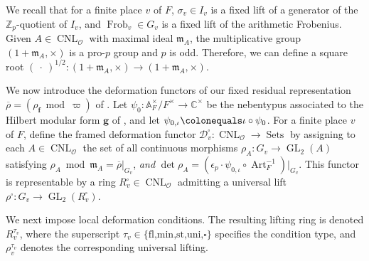 \documentclass[a4paper, notitlepage, 10pt]{amsart}
\theoremstyle{plain} %
\theoremstyle{definition} %
\theoremstyle{remark} %
\numberwithin{equation}{section}
\newcommand{\bbZ}{\mathbb Z}
\newcommand{\GL}{\operatorname{GL}} %
\newcommand{\CNL}{\operatorname{CNL}}
\newcommand{\Art}{\operatorname{Art}} %
\newcommand{\Frob}{\operatorname{Frob}} %
\newcommand{\Sets}{\operatorname{Sets}} %
\begin{document}
We recall that for a finite place $v$ of $F$, $\sigma_v\in I_v$ is a fixed lift of a generator of the $\bbZ_p$-quotient of $I_v$, and $\Frob_v\in G_v$ is a fixed lift of the arithmetic Frobenius. Given $A\in \CNL_{\mathcal{O}}$ with maximal ideal $\mathfrak{m}_A$, the multiplicative group $(1+\mathfrak{m}_A,\times)$ is a pro-$p$ group and $p$ is odd. Therefore, we can define a square root $(\ \cdot \ )^{1/2}\colon (1+\mathfrak{m}_A,\times) \to (1+\mathfrak{m}_A,\times)$. 



We now introduce the deformation functors of our fixed residual representation $\overline{\rho}=(\rho_{\mathbf{f}} \bmod \varpi)$ of . Let $\psi_0\colon \mathbb{A}_F^\times/F^\times\to \mathbb{C}^\times$ be the nebentypus associated to the Hilbert modular form $\mathbf{g}$ of , and let $\psi_{0,\iota}\colonequals \iota\circ \psi_{0}$. For a finite place $v$ of $F$, define the framed deformation functor $
\mathcal{D}^\square_v\colon \CNL_\mathcal{O} \rightarrow \Sets$ by assigning to each $A\in \CNL_{\mathcal{O}}$ the set of all continuous morphisms $\rho_A\colon G_{v}\rightarrow \GL_2(A)$ satisfying $\rho_A \bmod \mathfrak{m}_A=\overline{\rho}|_{G_{v}}$, \emph{and} $\det \rho_A=(\epsilon_p\cdot \psi_{0,\iota}\circ \Art_F^{-1})|_{G_v}$.
This functor is representable by a ring $R^\square_v\in \CNL_{\mathcal{O}}$ admitting a universal lift $\rho^\square\colon G_{v}\rightarrow \GL_2(R_v^\square)$.

We next impose local deformation conditions. The resulting lifting ring is denoted $R_v^{\tau_v}$, where the superscript $\tau_v\in \{\text{fl,min,st,uni,}\square\}$ specifies the condition type, and $\rho_v^{\tau_v}$ denotes the corresponding universal lifting.
\end{document}
